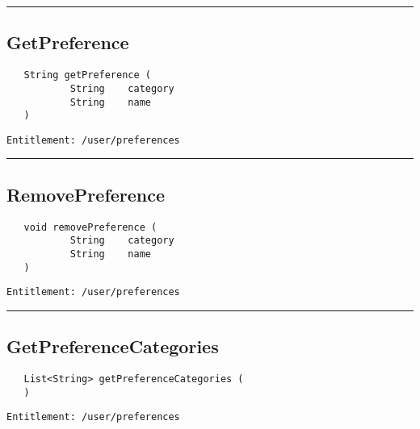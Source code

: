 \rule{12cm}{2pt}
\subsection{GetPreference}
\label{Api:GetPreference}
\begin{verbatim}
   String getPreference (
           String    category
           String    name
   )
\end{verbatim}
\begin{Verbatim}[fontsize=\small, formatcom=\color{Maroon}]
  Entitlement: /user/preferences
\end{Verbatim}



\rule{12cm}{2pt}
\subsection{RemovePreference}
\label{Api:RemovePreference}
\begin{verbatim}
   void removePreference (
           String    category
           String    name
   )
\end{verbatim}
\begin{Verbatim}[fontsize=\small, formatcom=\color{Maroon}]
  Entitlement: /user/preferences
\end{Verbatim}



\rule{12cm}{2pt}
\subsection{GetPreferenceCategories}
\label{Api:GetPreferenceCategories}
\begin{verbatim}
   List<String> getPreferenceCategories (
   )
\end{verbatim}
\begin{Verbatim}[fontsize=\small, formatcom=\color{Maroon}]
  Entitlement: /user/preferences
\end{Verbatim}



